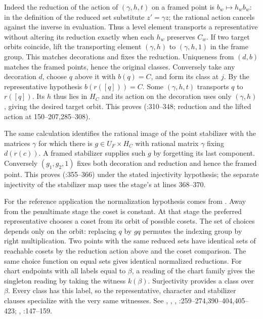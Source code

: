 Indeed the reduction of the action of $(\gamma,h,t)$ on a framed point
is $b_w\mapsto h_w b_w$: in the definition of the reduced set substitute
$z'=\gamma z$; the rational action cancels against the inverse in
evaluation. Thus a level element transports a representative without
altering its reduction exactly when each $h_w$ preserves $C_w$.
If two target orbits coincide, lift the transporting element
$(\gamma,h)$ to $(\gamma,h,1)$ in the frame group. This matches
decorations and fixes the reduction. Uniqueness from $(d,b)$ matches
the framed points, hence the original classes. Conversely take any
decoration $d$, choose $q$ above it with $b(q)=C$, and form its class at
$j$. By the representative hypothesis $b(r([q]))=C$. Some $(\gamma,h,t)$
transports $q$ to $r([q])$. Its $h$ thus lies in $H_C$ and its action on
the decoration uses only $(\gamma,h)$, giving the desired target orbit.
This proves 
(:310--348; reduction and the lifted
action at 150--207,285--308).

The same calculation identifies the rational image of the point
stabilizer with the matrices $\gamma$ for which there is $g\in
U_F\times H_C$ with rational matrix $\gamma$ fixing $d(r(c))$.
A framed stabilizer supplies such $g$ by forgetting its last component.
Conversely $(g_1,g_2,1)$ fixes both decoration and reduction and hence
the framed point. This proves 
(:355--366) under the stated
injectivity hypothesis; the separate injectivity of the stabilizer map
uses the stage's  at lines 368--370.

For the reference application the normalization hypothesis comes from
. Away from the penultimate stage the coset is constant.
At that stage the preferred representative chooses a coset from its orbit
of possible cosets. The set of choices depends only on the orbit:
replacing $q$ by $gq$ permutes the indexing group by right multiplication.
Two points with the same reduced sets have identical sets of reachable
cosets by the reduction action above and the coset comparison.
The same choice function on equal sets gives identical normalized
reductions. For chart endpoints with all labels equal to $\beta$,
a reading of the chart family gives the singleton reading by taking
the witness $k(\beta)$. Surjectivity provides a class over $\beta$.
Every class has this label, so the representative, character and
stabilizer clauses specialize with the very same witnesses.
See , , ,
:259--274,390--404,405--423;
, :147--159.

